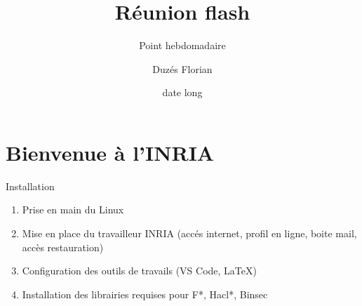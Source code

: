 \documentclass[A4,svgnames,9pt,aspectratio=169]{beamer}
\title[titrecourt]{Réunion flash}
\subtitle{Point hebdomadaire}
\date[18/04/2025]{date long}
\author[Duzes Florian]{Duzés Florian}
\begin{document}

\frame{\titlepage}


\renewcommand{\contentsname}{Sommaire}

\frame{\tocpage}


 
\section{Bienvenue à l'INRIA}
\frame{\sectionpage}

\begin{frame}{Installation}
      \begin{enumerate}
         \item Prise en main du Linux
         \item Mise en place du travailleur INRIA (accés internet, profil en ligne, boite mail, accès restauration)
         \item Configuration des outils de travails (VS Code, LaTeX)
         \item Installation des librairies requises pour F*, Hacl*, Binsec
      \end{enumerate}
\end{frame}
\end{document}
